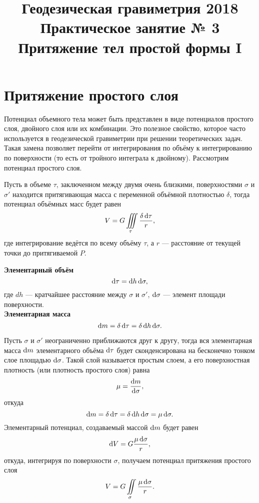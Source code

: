 \documentclass[11pt, a4paper]{article}
\title{{\Large Геодезическая гравиметрия 2018}\\ 
    {\bf\Large Практическое занятие № 3} \\
{\Large Притяжение тел простой формы I}}
\author{}
\date{\DTMusedate{lessondate}}
\theoremstyle{plain}
\theoremstyle{definition}
\theoremstyle{remark}
\begin{document}
\maketitle

\section{Притяжение простого слоя}

Потенциал объемного тела может быть представлен в виде потенциалов простого слоя, двойного слоя или
их комбинации. Это полезное свойство, которое часто используется в геодезической гравиметрии при
решении теоретических задач. Такая замена позволяет перейти от интегрирования по объёму к
интегрированию по поверхности (то есть от тройного интеграла к двойному). Рассмотрим потенциал
простого слоя.

Пусть в объеме $\tau$, заключенном между двумя очень близкими, поверхностями $\sigma$ и $\sigma'$
находится притягивающая масса с переменной объёмной плотностью $\delta$, тогда потенциал объёмных
масс будет равен
\begin{equation*}
    V = G\iiint\limits_{\tau}\dfrac{\delta\dif\tau}{r},
\end{equation*}
где интегрирование ведётся по всему объёму $\tau$, а $r$ --- расстояние от текущей 
точки до притягиваемой $P$.

\textbf{Элементарный объём}
\begin{equation*}
    \dif\tau = \dif h\dif\sigma,
\end{equation*}
где $dh$ --- кратчайшее расстояние между $\sigma$ и $\sigma'$,
$\dif\sigma$ --- элемент площади поверхности. \\

\textbf{Элементарная масса}
\begin{equation*}
    \dif m = \delta\dif\tau = \delta\dif h\dif\sigma.
\end{equation*}

Пусть $\sigma$ и $\sigma'$ неограниченно приближаются друг к другу, тогда вся элементарная масса
$\dif m$ элементарного объёма $\dif\tau$ будет сконденсирована на бесконечно тонком слое площадью
$\dif\sigma$. Такой слой называется простым слоем, а его поверхностная плотность (или плотность
простого слоя) равна
\begin{equation*}
    \mu = \dfrac{\dif m }{\dif \sigma},
\end{equation*}
откуда
\begin{equation*}
    \dif m = \delta\dif\tau = \delta\dif h\dif\sigma = \mu\dif\sigma. 
\end{equation*}
Элементарный потенциал, создаваемый массой $\dif m$ будет равен
\begin{equation*}
    \dif V = G\dfrac{\mu\dif\sigma}{r},
\end{equation*}
откуда, интегрируя по поверхности $\sigma$, получаем потенциал притяжения простого слоя
\begin{equation*}
    V = G\iint\limits_{\sigma}\dfrac{\mu\dif\sigma}{r}.
\end{equation*}
\end{document}
